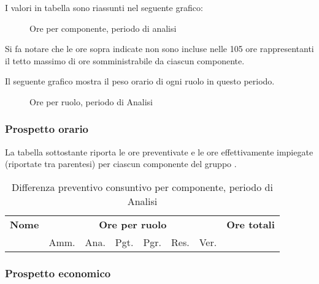 	I valori in tabella sono riassunti nel seguente grafico: \\ 

	\begin{figure}[H]
	\caption{Ore per componente, periodo di analisi}
	\end{figure}

	Si fa notare che le ore sopra indicate non sono incluse nelle 105 ore rappresentanti il tetto massimo di ore somministrabile da ciascun componente.

	Il seguente grafico mostra il peso orario di ogni ruolo in questo periodo.

	\begin{figure}[H]
	\begin{tikzpicture}
		
	\end{tikzpicture}
	\caption{Ore per ruolo, periodo di Analisi}
	\end{figure}


	\subsubsection{Prospetto orario}

	La tabella sottostante riporta le ore preventivate e le ore effettivamente impiegate (riportate tra parentesi) per ciascun componente del gruppo \GroupName{}.

	\begin{center}
	\begin{table}[H]
	\begin{tabular}{lccccccc}
	\toprule
	    \textbf{Nome}  & \multicolumn{6}{c}{\textbf{Ore per ruolo}} & \textbf{Ore totali} \\
	     & Amm. & Ana. & Pgt. & Pgr. & Res. & Ver. & \\
	    \midrule
	    
	    \bottomrule
	\end{tabular}
	\caption{Differenza preventivo consuntivo per componente, periodo di Analisi}
	\end{table}
	\end{center}


	\subsubsection{Prospetto economico}
	
